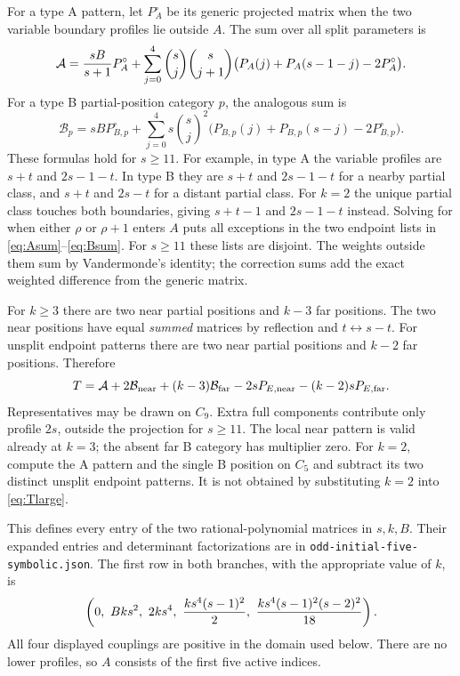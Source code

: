 \documentclass[11pt]{article}
\theoremstyle{remark}\newtheorem{remark}[theorem]{Remark}
\begin{document}
For a type A pattern, let $P_A^\circ$ be its generic projected
matrix when the two variable boundary profiles lie outside $A$.
The sum over all split parameters is
\begin{align}
 \mathcal A={sB\over s+1}P_A^\circ+
 \sum_{j=0}^{4}\binom{s}{j}\binom{s}{j+1}
 \bigl(P_A(j)+P_A(s-1-j)-2P_A^\circ\bigr).             \label{eq:Asum}
\end{align}
For a type B partial-position category $p$, the analogous sum is
\begin{equation}
 \mathcal B_p=sB P_{B,p}^\circ+
 \sum_{j=0}^{4}s\binom{s}{j}^2
 \bigl(P_{B,p}(j)+P_{B,p}(s-j)-2P_{B,p}^\circ\bigr).    \label{eq:Bsum}
\end{equation}
These formulas hold for $s\ge11$.
For example, in type A the variable profiles are $s+t$ and
$2s-1-t$. In type B they are $s+t$ and $2s-1-t$ for a nearby
partial class, and $s+t$ and $2s-t$ for a distant partial class.
For $k=2$ the unique partial class touches both boundaries,
giving $s+t-1$ and $2s-1-t$ instead.
Solving for when either $\rho$ or $\rho+1$ enters $A$ puts all
exceptions in the two endpoint lists in \eqref{eq:Asum}--\eqref{eq:Bsum}.
For $s\ge11$ these lists are disjoint. The weights outside
them sum by Vandermonde's identity; the correction sums add
the exact weighted difference from the generic matrix.

For $k\ge3$ there are two near partial positions and $k-3$ far
positions. The two near positions have equal \emph{summed} matrices
by reflection and $t\leftrightarrow s-t$.
For unsplit endpoint patterns there are two near partial positions
and $k-2$ far positions. Therefore
\begin{equation}
 T=\mathcal A+2\mathcal B_{\rm near}
 +(k-3)\mathcal B_{\rm far}
 -2sP_{E,\rm near}-(k-2)sP_{E,\rm far}.                \label{eq:Tlarge}
\end{equation}
Representatives may be drawn on $C_9$. Extra full components
contribute only profile $2s$, outside the projection for $s\ge11$.
The local near pattern is valid already at $k=3$; the absent
far B category has multiplier zero.
For $k=2$, compute the A pattern and the single B position on
$C_5$ and subtract its two distinct unsplit endpoint patterns.
It is not obtained by substituting $k=2$ into \eqref{eq:Tlarge}.

This defines every entry of the two rational-polynomial matrices
in $s,k,B$. Their expanded entries and determinant factorizations
are in \texttt{odd-initial-five-symbolic.json}.
The first row in both branches, with the appropriate value of $k$, is
\begin{equation}
 \left(0,\ Bks^2,\ 2ks^4,\
 {ks^4(s-1)^2\over2},\
 {ks^4(s-1)^2(s-2)^2\over18}\right).                  \label{eq:firstrow}
\end{equation}
All four displayed couplings are positive in the domain used below.
There are no lower profiles, so $A$ consists of the first five
active indices.
\end{document}
